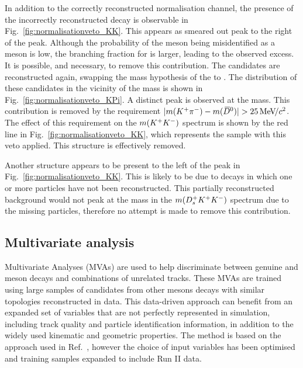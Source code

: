 In addition to the correctly reconstructed normalisation channel, the presence of the incorrectly reconstructed \decay{\Bp}{\Dsp(\decay{\Dzb}{\Kp\pim})} decay is observable in Fig.~\ref{fig:normalisationveto_KK}. This appears as smeared out peak to the right of the \Dzb peak. Although the probability of the \pim meson being misidentified as a \Km meson is low, the branching fraction for \decay{\Dzb}{\Kp\pim} is larger, leading to the observed excess. It is possible, and necessary, to remove this contribution. The \Kp\Km candidates are reconstructed again, swapping the mass hypothesis of the \Km to \pim. The distribution of these candidates in the vicinity of the \Dzb mass is shown in Fig.~\ref{fig:normalisationveto_KPi}. A distinct peak is observed at the \Dzb mass. This contribution is removed by the requirement $|m({{K}^+}{{\pi}^-}) - m({{\kern 0.2em\overline{\kern -0.2em D}{}}{}^0})| > 25 {\mathrm{\,Me\kern -0.1em V\!/}c^2}$. The effect of this requirement on the $m({{K}^+}{{K}^-})$ spectrum is shown by the red line in Fig.~\ref{fig:normalisationveto_KK}, which represents the sample with this veto applied. This structure is effectively removed. 

Another structure appears to be present to the left of the \Dzb peak in Fig.~\ref{fig:normalisationveto_KK}. This is likely to be due to  decays in which one or more particles have not been reconstructed. This partially reconstructed background would not peak at the \Bp mass in the $m({{D}^+_{s}}{{K}^+}{{K}^-})$ spectrum due to the missing particles, therefore no attempt is made to remove this contribution.


\subsection{Multivariate analysis}

Multivariate Analyses (MVAs) are used to help discriminate between genuine \Dsp and \phiz meson decays and combinations of unrelated tracks. 
These MVAs are trained using large samples of candidates from other \B mesons decays with similar topologies reconstructed in data. 
This data-driven approach can benefit from an expanded set of variables that are not perfectly represented in simulation, including track quality and particle identification information, in addition to the widely used kinematic and geometric properties.
The method is based on the approach used in Ref.~\cite{LHCb-PAPER-2012-050}, however the choice of input variables has been optimised and training samples expanded to include Run II data.

